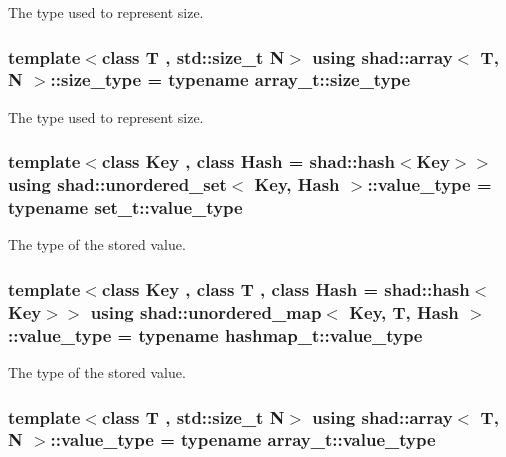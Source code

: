 The type used to represent size. 

\hypertarget{group__Types_ga037c76c91958f47f53bfebad4d67f8bb}{
\subsubsection[{size\-\_\-type}]{\setlength{\rightskip}{0pt plus 5cm}template$<$class T , std\-::size\-\_\-t N$>$ using {\bf shad\-::array}$<$ T, N $>$\-::size\-\_\-type =  typename array\-\_\-t\-::size\-\_\-type}}\label{group__Types_ga037c76c91958f47f53bfebad4d67f8bb}


The type used to represent size. 

\hypertarget{group__Types_ga56832ea0d8218bf22f59a2e8ff4de499}{
\subsubsection[{value\-\_\-type}]{\setlength{\rightskip}{0pt plus 5cm}template$<$class Key , class Hash  = shad\-::hash$<$\-Key$>$$>$ using {\bf shad\-::unordered\-\_\-set}$<$ Key, Hash $>$\-::value\-\_\-type =  typename set\-\_\-t\-::value\-\_\-type}}\label{group__Types_ga56832ea0d8218bf22f59a2e8ff4de499}


The type of the stored value. 

\hypertarget{group__Types_ga930e4848d41a2efe4d2e47f52650a76c}{
\subsubsection[{value\-\_\-type}]{\setlength{\rightskip}{0pt plus 5cm}template$<$class Key , class T , class Hash  = shad\-::hash$<$\-Key$>$$>$ using {\bf shad\-::unordered\-\_\-map}$<$ Key, T, Hash $>$\-::value\-\_\-type =  typename hashmap\-\_\-t\-::value\-\_\-type}}\label{group__Types_ga930e4848d41a2efe4d2e47f52650a76c}


The type of the stored value. 

\hypertarget{group__Types_gaf417752888d4f1e19286503579310a52}{
\subsubsection[{value\-\_\-type}]{\setlength{\rightskip}{0pt plus 5cm}template$<$class T , std\-::size\-\_\-t N$>$ using {\bf shad\-::array}$<$ T, N $>$\-::value\-\_\-type =  typename array\-\_\-t\-::value\-\_\-type}}\label{group__Types_gaf417752888d4f1e19286503579310a52}
